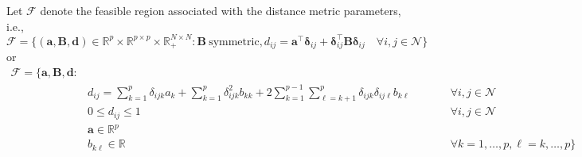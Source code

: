 \documentclass[]{article}
\renewcommand{\v}[1]{\ensuremath{\mathbf{#1}}}
\newcommand{\mc}{\mathcal}
\renewcommand{\Re}{\mathbb{R}} %
\newcommand{\vdelta}{\boldsymbol{\delta}}
\begin{document}
Let $\mc{F}$ denote the feasible region associated with the distance metric parameters, i.e.,
\begin{equation}
\mc{F} = \{ (\v{a},\v{B},\v{d}) \in \Re^p \times \Re^{p \times p} \times \Re_+^{N \times N} : \v{B}~\text{symmetric}, d_{ij} = \v{a}^{\top}\vdelta_{ij} + \vdelta_{ij}^{\top} \v{B}\vdelta_{ij} \quad \forall i,j \in \mc{N} \}
\end{equation}
or
\begin{subequations} \label{set:feasible_region_distance_metric}
\begin{alignat}{4}
\mc{F} = \Bigg\{ \v{a},\v{B},\v{d} : &  &&  \\
    & d_{ij} = \sum_{k=1}^p \delta_{ijk} a_{k} + \sum_{k=1}^p \delta_{ijk}^2 b_{kk} + 2 \sum_{k=1}^{p-1} \sum_{\ell=k+1}^p  \delta_{ijk} \delta_{ij\ell} b_{k\ell} && \qquad \forall i,j \in \mc{N} \label{eq:distance_metric_def} \\
    & 0 \leq d_{ij} \leq 1 && \qquad \forall i,j \in \mc{N} \\
    & \v{a} \in \Re^p && \\ 
    & b_{k\ell} \in \Re && \qquad \forall k=1,\dots,p, \ell=k,\dots,p \Bigg\}
\end{alignat}
\end{subequations}
\end{document}
